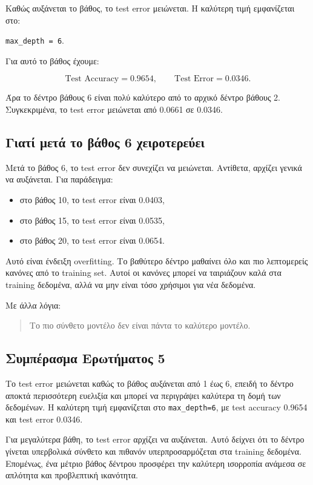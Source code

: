 \documentclass[12pt,a4paper]{article}
\newcommand{\code}[1]{\texttt{\textenglish{#1}}}
\begin{document}
Καθώς αυξάνεται το βάθος, το test error μειώνεται. Η καλύτερη τιμή εμφανίζεται
στο:

\begin{center}
\code{max\_depth = 6}.
\end{center}

Για αυτό το βάθος έχουμε:

\[
    \text{Test Accuracy} = 0.9654,
    \qquad
    \text{Test Error} = 0.0346.
\]

Άρα το δέντρο βάθους 6 είναι πολύ καλύτερο από το αρχικό δέντρο βάθους 2.
Συγκεκριμένα, το test error μειώνεται από 0.0661 σε 0.0346.

\subsection{Γιατί μετά το βάθος 6 χειροτερεύει}

Μετά το βάθος 6, το test error δεν συνεχίζει να μειώνεται. Αντίθετα, αρχίζει
γενικά να αυξάνεται. Για παράδειγμα:

\begin{itemize}
    \item στο βάθος 10, το test error είναι 0.0403,
    \item στο βάθος 15, το test error είναι 0.0535,
    \item στο βάθος 20, το test error είναι 0.0654.
\end{itemize}

Αυτό είναι ένδειξη overfitting. Το βαθύτερο δέντρο μαθαίνει όλο και πιο
λεπτομερείς κανόνες από το training set. Αυτοί οι κανόνες μπορεί να
ταιριάζουν καλά στα training δεδομένα, αλλά να μην είναι τόσο χρήσιμοι για
νέα δεδομένα.

Με άλλα λόγια:

\begin{quote}
Το πιο σύνθετο μοντέλο δεν είναι πάντα το καλύτερο μοντέλο.
\end{quote}

\subsection{Συμπέρασμα Ερωτήματος 5}

Το test error μειώνεται καθώς το βάθος αυξάνεται από 1 έως 6, επειδή το
δέντρο αποκτά περισσότερη ευελιξία και μπορεί να περιγράψει καλύτερα τη δομή
των δεδομένων. Η καλύτερη τιμή εμφανίζεται στο \code{max\_depth=6}, με test
accuracy 0.9654 και test error 0.0346.

Για μεγαλύτερα βάθη, το test error αρχίζει να αυξάνεται. Αυτό δείχνει ότι το
δέντρο γίνεται υπερβολικά σύνθετο και πιθανόν υπερπροσαρμόζεται στα training
δεδομένα. Επομένως, ένα μέτριο βάθος δέντρου προσφέρει την καλύτερη ισορροπία
ανάμεσα σε απλότητα και προβλεπτική ικανότητα.
\end{document}

